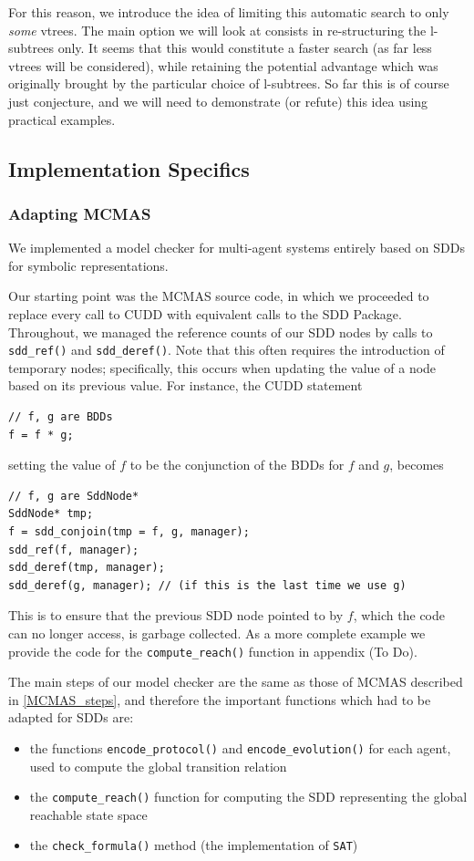 \documentclass[11pt]{article}
\begin{document}
For this reason, we introduce the idea of limiting this automatic search to only \textit{some} vtrees. The main option we will look at consists in re-structuring the l-subtrees only. It seems that this would constitute a faster search (as far less vtrees will be considered), while retaining the potential advantage which was originally brought by the particular choice of l-subtrees. So far this is of course just conjecture, and we will need to demonstrate (or refute) this idea using practical examples.


\subsection{Implementation Specifics}

\subsubsection{Adapting MCMAS}

We implemented a model checker for multi-agent systems entirely based on SDDs for symbolic representations. 

Our starting point was the MCMAS source code, in which we proceeded to replace every call to CUDD with equivalent calls to the SDD Package. Throughout, we managed the reference counts of our SDD nodes by calls to \texttt{sdd\_ref()} and 
\texttt{sdd\_deref()}. Note that this often requires the introduction of temporary nodes; specifically, this occurs when updating the value of a node based on its previous value. For instance, the CUDD statement 
\begin{verbatim}
// f, g are BDDs
f = f * g; 
\end{verbatim}
setting the value of $f$ to be the conjunction of the BDDs for $f$ and $g$, becomes
\begin{verbatim}
// f, g are SddNode*
SddNode* tmp;
f = sdd_conjoin(tmp = f, g, manager);
sdd_ref(f, manager);
sdd_deref(tmp, manager);
sdd_deref(g, manager); // (if this is the last time we use g)
\end{verbatim}
This is to ensure that the previous SDD node pointed to by $f$, which the code can no longer access, is garbage collected. As a more complete example we provide the code for the \texttt{compute\_reach()} function in appendix (To Do).

The main steps of our model checker are the same as those of MCMAS described in \ref{MCMAS_steps}, and therefore the important functions which had to be adapted for SDDs are: 
\begin{itemize}
\item the functions \texttt{encode\_protocol()}  and \texttt{encode\_evolution()} for each agent, used to compute the global transition relation
\item the \texttt{compute\_reach()} function for computing the SDD representing the global reachable state space
\item the \texttt{check\_formula()} method (the implementation of \texttt{SAT})
\end{itemize}
\end{document}
